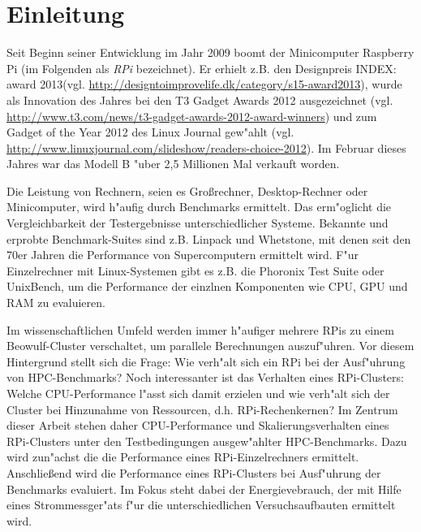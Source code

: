 \chapter{Einleitung}\label{Kap1}
\enlargethispage{0.7cm}
Seit Beginn seiner Entwicklung im Jahr 2009 boomt der Minicomputer Raspberry Pi (im Folgenden als \textit{RPi} bezeichnet). Er erhielt z.B. den Designpreis INDEX: award 2013\newline(vgl. \url{http://designtoimprovelife.dk/category/s15-award2013}), wurde als Innovation des Jahres bei den T3 Gadget Awards 2012 ausgezeichnet (vgl. \url{http://www.t3.com/news/t3-gadget-awards-2012-award-winners}) und zum Gadget of the Year 2012 des Linux Journal gew"ahlt (vgl. \url{http://www.linuxjournal.com/slideshow/readers-choice-2012}). Im Februar dieses Jahres war das Modell B "uber 2,5 Millionen Mal verkauft worden. 

Die Leistung von Rechnern, seien es Gro\ss rechner, Desktop-Rechner oder Minicomputer, wird h"aufig durch Benchmarks ermittelt. Das erm"oglicht die Vergleichbarkeit der Testergebnisse unterschiedlicher Systeme. Bekannte und erprobte Benchmark-Suites sind z.B. Linpack und Whetstone, mit denen seit den 70er Jahren die Performance von Supercomputern ermittelt wird. F"ur Einzelrechner mit Linux-Systemen gibt es z.B. die Phoronix Test Suite oder UnixBench, um die Performance der einzlnen Komponenten wie CPU, GPU und RAM zu evaluieren. 

Im wissenschaftlichen Umfeld werden immer h"aufiger mehrere RPis zu einem Beowulf-Cluster %
verschaltet, um parallele Berechnungen auszuf"uhren. Vor diesem Hintergrund stellt sich die Frage: Wie verh"alt sich ein RPi bei der Ausf"uhrung von HPC-Benchmarks? Noch interessanter ist das Verhalten eines RPi-Clusters: Welche CPU-Performance l"asst sich damit erzielen und wie verh"alt sich der Cluster bei Hinzunahme von Ressourcen, d.h. RPi-Rechenkernen? Im Zentrum dieser Arbeit stehen daher CPU-Performance und Skalierungsverhalten eines RPi-Clusters unter den Testbedingungen ausgew"ahlter HPC-Benchmarks. Dazu wird zun"achst die die Performance eines RPi-Einzelrechners ermittelt. Anschlie\ss end wird die Performance eines RPi-Clusters bei Ausf"uhrung der Benchmarks evaluiert. Im Fokus steht dabei der Energievebrauch, der mit Hilfe eines Strommessger"ats f"ur die unterschiedlichen Versuchsaufbauten ermittelt wird. 

